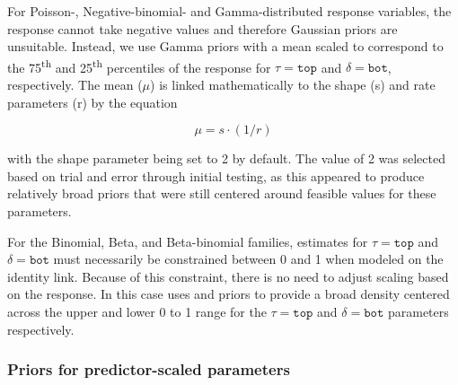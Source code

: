 \documentclass[
  shortnames]{jss}
\begin{document}
For Poisson-, Negative-binomial- and Gamma-distributed response variables, the response cannot take negative values and therefore Gaussian priors are unsuitable. Instead, we use Gamma priors with a mean scaled to correspond to the 75\textsuperscript{th} and 25\textsuperscript{th} percentiles of the response for \(\tau = \mathtt{top}\) and \(\delta = \mathtt{bot}\), respectively. The mean (\(\mu\)) is linked mathematically to the shape (s) and rate parameters (r) by the equation \citep{Becker1988}

\[ \mu = s \cdot (1 / r) \]

with the shape parameter being set to 2 by default. The value of 2 was selected based on trial and error through initial testing, as this appeared to produce relatively broad priors that were still centered around feasible values for these parameters.

For the Binomial, Beta, and Beta-binomial families, estimates for \(\tau = \mathtt{top}\) and \(\delta = \mathtt{bot}\) must necessarily be constrained between 0 and 1 when modeled on the identity link. Because of this constraint, there is no need to adjust scaling based on the response. In this case  uses  and  priors to provide a broad density centered across the upper and lower 0 to 1 range for the \(\tau = \mathtt{top}\) and \(\delta = \mathtt{bot}\) parameters respectively.

\hypertarget{priors-for-predictor-scaled-parameters}{%
\subsubsection{Priors for predictor-scaled parameters}\label{priors-for-predictor-scaled-parameters}}
\end{document}
